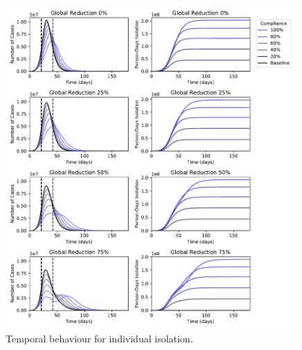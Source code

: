 \documentclass[10pt,a4paper]{article}
\begin{document}
\begin{figure}[H]
\begin{center}
\includegraphics[width=0.99\textwidth]{time_series.pdf}
\end{center}
\caption{Temporal behaviour for individual isolation.}
\end{figure}

\clearpage
\end{document}
